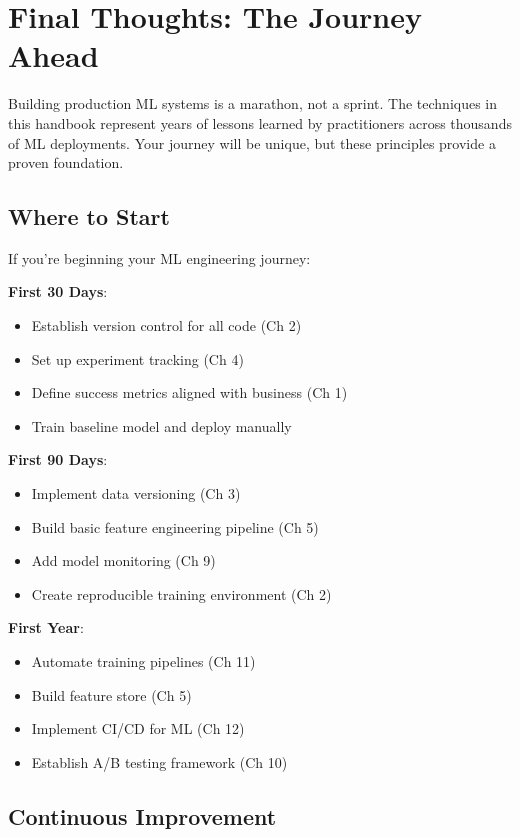\section{Final Thoughts: The Journey Ahead}

Building production ML systems is a marathon, not a sprint. The techniques in this handbook represent years of lessons learned by practitioners across thousands of ML deployments. Your journey will be unique, but these principles provide a proven foundation.

\subsection{Where to Start}

If you're beginning your ML engineering journey:

\textbf{First 30 Days}:
\begin{itemize}
    \item Establish version control for all code (Ch 2)
    \item Set up experiment tracking (Ch 4)
    \item Define success metrics aligned with business (Ch 1)
    \item Train baseline model and deploy manually
\end{itemize}

\textbf{First 90 Days}:
\begin{itemize}
    \item Implement data versioning (Ch 3)
    \item Build basic feature engineering pipeline (Ch 5)
    \item Add model monitoring (Ch 9)
    \item Create reproducible training environment (Ch 2)
\end{itemize}

\textbf{First Year}:
\begin{itemize}
    \item Automate training pipelines (Ch 11)
    \item Build feature store (Ch 5)
    \item Implement CI/CD for ML (Ch 12)
    \item Establish A/B testing framework (Ch 10)
\end{itemize}

\subsection{Continuous Improvement}

